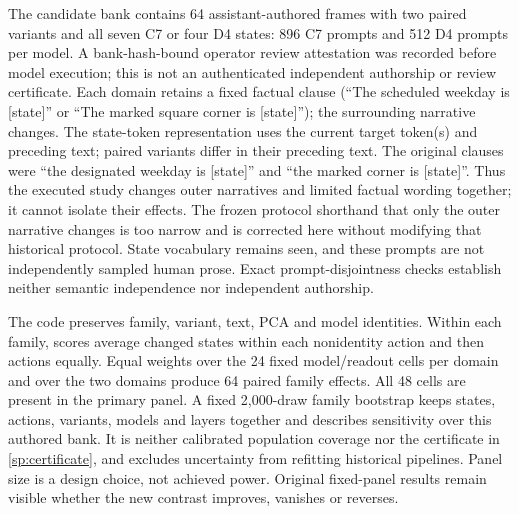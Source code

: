The candidate bank contains 64 assistant-authored frames with two paired variants and all seven C7 or four D4 states: 896 C7 prompts and 512 D4 prompts per model. A bank-hash-bound operator review attestation was recorded before model execution; this is not an authenticated independent authorship or review certificate. Each domain retains a fixed factual clause (``The scheduled weekday is [state]'' or ``The marked square corner is [state]''); the surrounding narrative changes. The state-token representation uses the current target token(s) and preceding text; paired variants differ in their preceding text. The original clauses were ``the designated weekday is [state]'' and ``the marked corner is [state]''. Thus the executed study changes outer narratives and limited factual wording together; it cannot isolate their effects. The frozen protocol shorthand that only the outer narrative changes is too narrow and is corrected here without modifying that historical protocol. State vocabulary remains seen, and these prompts are not independently sampled human prose. Exact prompt-disjointness checks establish neither semantic independence nor independent authorship.

The code preserves family, variant, text, PCA and model identities. Within each family, scores average changed states within each nonidentity action and then actions equally. Equal weights over the 24 fixed model/readout cells per domain and over the two domains produce 64 paired family effects. All 48 cells are present in the primary panel. A fixed 2,000-draw family bootstrap keeps states, actions, variants, models and layers together and describes sensitivity over this authored bank. It is neither calibrated population coverage nor the certificate in \cref{sp:certificate}, and excludes uncertainty from refitting historical pipelines. Panel size is a design choice, not achieved power. Original fixed-panel results remain visible whether the new contrast improves, vanishes or reverses.

